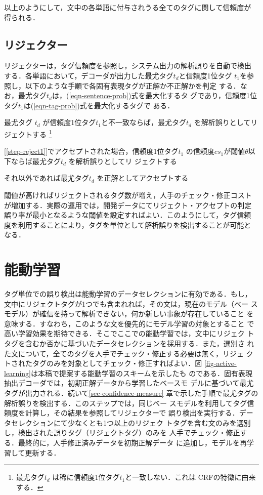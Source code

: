 \documentclass[japanese]{jnlp_1.4}
\newenvironment{stepenumerate}{}{}
\begin{document}
以上のようにして，文中の各単語に付与されうる全てのタグに関して信頼度が
得られる．


\subsection{リジェクター}
\label{sec-rejector}

リジェクターは，タグ信頼度を参照し，システム出力の解析誤りを自動で検出
する．各単語において，デコーダが出力した最尤タグ$t_d$と信頼度1位タグ
$t_1$を参照し，以下のような手順で各固有表現タグが正解か不正解かを判定
する．なお，最尤タグ$t_d$は，(\ref{eqn-sentence-prob})式を最大化するタ
グであり，信頼度1位タグ$t_1$は(\ref{eqn-tag-prob})式を最大化するタグで
ある．

\begin{stepenumerate}
\item 最尤タグ $t_d$ が信頼度1位タグ$t_1$と不一致ならば，最尤タグ$t_d$
を解析誤りとしてリジェクトする
\footnote{最尤タグ$t_d$ は稀に信頼度1位タグ$t_1$と一致しない．これは
CRFの特徴に由来する．}
\label{step-reject1}
\item {[\ref{step-reject1}]}でアクセプトされた場合，信頼度1位タグ$t_1$
の信頼度$cs_1$が閾値$\theta$以下ならば最尤タグ$t_d$ を解析誤りとしてリ
ジェクトする
\item それ以外であれば最尤タグ$t_d$ を正解としてアクセプトする
\end{stepenumerate}

閾値が高ければリジェクトされるタグ数が増え，人手のチェック・修正コスト
が増加する．実際の運用では，開発データにてリジェクト・アクセプトの判定
誤り率が最小となるような閾値を設定すればよい．このようにして，タグ信頼
度を利用することにより，タグを単位として解析誤りを検出することが可能と
なる．


\section{能動学習}
\label{sec-active-learning}

タグ単位での誤り検出は能動学習のデータセレクションに有効である．もし，
文中にリジェクトタグが1つでも含まれれば，その文は，現在のモデル（ベー
スモデル）が確信を持って解析できない，何か新しい事象が存在していること
を意味する．すなわち，このような文を優先的にモデル学習の対象とすること
で高い学習効果を期待できる．そこでここでの能動学習では，文中にリジェク
トタグを含むか否かに基づいたデータセレクションを採用する．また，選別さ
れた文について，全てのタグを人手でチェック・修正する必要は無く，リジェ
クトされたタグのみを対象としてチェック・修正すればよい．図
\ref{fig-active-learning}は本稿で提案する能動学習のスキームを示したも
のである．固有表現抽出デコーダでは，初期正解データから学習したベースモ
デルに基づいて最尤タグが出力される．続いて\ref{sec-confidence-measure} 
章で示した手順で最尤タグの解析誤りを検出する．このステップでは，同じベー
スモデルを利用してタグ信頼度を計算し，その結果を参照してリジェクターで
誤り検出を実行する．データセレクションにて少なくとも1つ以上のリジェク
トタグを含む文のみを選別し，検出された誤りタグ（リジェクトタグ）のみを
人手でチェック・修正する．最終的に，人手修正済みデータを初期正解データ
に追加し，モデルを再学習して更新する．
\end{document}
